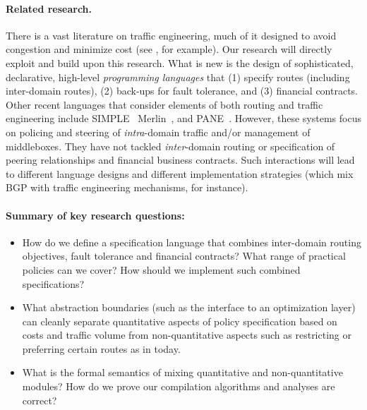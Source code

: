 \paragraph*{Related research.}
There is a vast literature on traffic engineering, much of it designed to avoid congestion 
and minimize cost (see \cite{Awduche:traffic-engineering,Fortz:traffic-engineering}, for
example).  Our research will directly exploit and build upon this research.
What is new is the design of
sophisticated, declarative, high-level \emph{programming languages} that 
(1) specify routes (including inter-domain routes), (2) back-ups for fault
tolerance, and (3) financial contracts.
Other recent languages that consider elements of both routing and traffic
engineering include SIMPLE~\cite{simple}
 Merlin~\cite{foster:merlin}, and PANE~\cite{Ferguson:2013}. However, these systems focus on 
policing and steering of \emph{intra}-domain traffic
and/or management of middleboxes.  They have not tackled 
\emph{inter}-domain routing or specification of peering relationships and 
financial business contracts.  
Such interactions will lead to different language designs and different implementation
strategies (which mix BGP with traffic engineering mechanisms, for instance).

\paragraph*{Summary of key research questions:}

\begin{itemize}
\item How do we define a specification language that combines inter-domain
routing objectives, fault tolerance and financial contracts?  What range of
practical policies can we cover?  How
should we implement such combined specifications?
\item What abstraction boundaries (such as the interface to an optimization layer) can cleanly separate quantitative aspects of policy specification based on costs and traffic volume from non-quantitative aspects such as restricting or preferring certain routes as in \Propane today.
\item What is the formal 
semantics of mixing quantitative and non-quantitative modules?  How do we prove our
compilation algorithms and analyses are correct?
\end{itemize}

